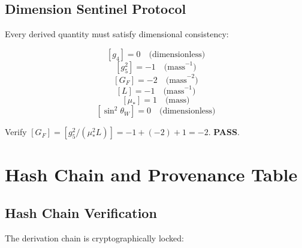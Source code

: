 \documentclass[11pt,a4paper]{article}
\begin{document}
\subsection{Dimension Sentinel Protocol}
\label{subsec:dimension-sentinel}

Every derived quantity must satisfy dimensional consistency:

\begin{equation}
\label{eq:dim-g4}
[g_4] = 0 \quad \text{(dimensionless)}
\end{equation}
\begin{equation}
\label{eq:dim-g5}
[g_5^2] = -1 \quad \text{(mass}^{-1}\text{)}
\end{equation}
\begin{equation}
\label{eq:dim-GF}
[G_F] = -2 \quad \text{(mass}^{-2}\text{)}
\end{equation}
\begin{equation}
\label{eq:dim-L}
[L] = -1 \quad \text{(mass}^{-1}\text{)}
\end{equation}
\begin{equation}
\label{eq:dim-mu}
[\mu_*] = 1 \quad \text{(mass)}
\end{equation}
\begin{equation}
\label{eq:dim-sin2}
[\sin^2\theta_W] = 0 \quad \text{(dimensionless)}
\end{equation}

\begin{trapbox}
\label{trap:rt02}
Verify $[G_F] = [g_5^2/(\mu_*^2 L)] = -1 + (-2) + 1 = -2$. \textbf{PASS}.
\end{trapbox}

\section{Hash Chain and Provenance Table}
\label{sec:hash-chain}

\subsection{Hash Chain Verification}
\label{subsec:hash-chain}

The derivation chain is cryptographically locked:
\end{document}
